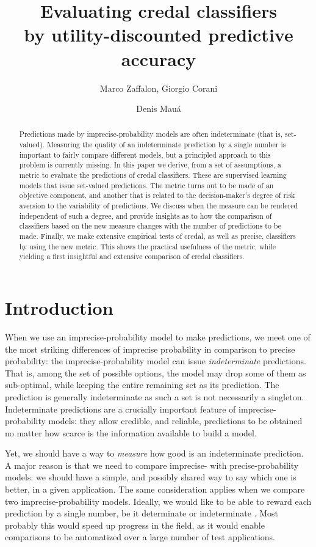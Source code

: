 \documentclass[a4paper,10pt,reqno]{amsart}
\title[Evaluating credal classifiers]{Evaluating credal classifiers\\by utility-discounted predictive accuracy}
\author{Marco Zaffalon, Giorgio Corani \and Denis Mau\'a}
\theoremstyle{remark}
\begin{document}
\maketitle

\begin{abstract}
Predictions made by imprecise-probability models are often indeterminate (that is, set-valued). Measuring the quality of an indeterminate prediction by a single number is important to fairly compare different models, but a principled approach to this problem is currently missing. In this paper we derive, from a set of assumptions, a metric to evaluate the predictions of credal classifiers. These are supervised learning models that issue set-valued predictions. The metric turns out to be made of an objective component, and another that is related to the decision-maker's degree of risk aversion to the variability of predictions. We discuss when the measure can be rendered independent of such a degree, and provide insights as to how the comparison of classifiers based on the new measure changes with the number of predictions to be made. Finally, we make extensive empirical tests of credal, as well as precise, classifiers by using the new metric. This shows the practical usefulness of the metric, while yielding a first insightful and extensive comparison of credal classifiers.
\end{abstract}

\section{Introduction}

When we use an imprecise-probability model to make predictions, we meet one of the most striking differences of imprecise probability in comparison to precise probability: the imprecise-probability model can issue \emph{indeterminate} predictions. That is, among the set of possible options, the model may drop some of them as sub-optimal, while keeping the entire remaining set as its prediction. The prediction is generally indeterminate as such a set is not necessarily a singleton. Indeterminate predictions are a crucially important feature of imprecise-probability models: they allow credible, and reliable, predictions to be obtained no matter how scarce is the information available to build a model.

Yet, we should have a way to \emph{measure} how good is an indeterminate prediction. A major reason is that we need to compare imprecise- with precise-probability models: we should have a simple, and possibly shared way to say which one is better, in a given application. The same consideration applies when we compare two imprecise-probability models. Ideally, we would like to be able to reward each prediction by a single number, be it determinate or indeterminate . Most probably this would speed up progress in the field, as it would enable comparisons to be automatized over a large number of test applications.
\end{document}

